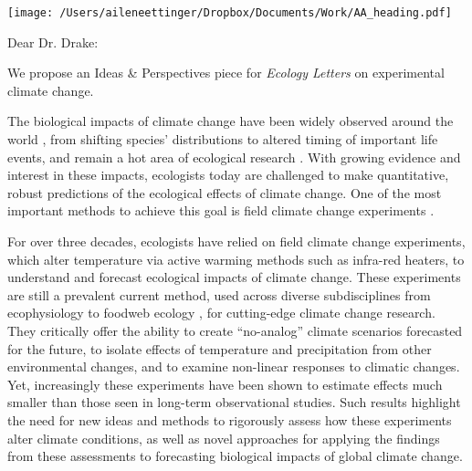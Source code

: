 \documentclass[11pt,a4paper]{letter}
\begin{document}


\begin{letter}{}
\texttt{[image: /Users/aileneettinger/Dropbox/Documents/Work/AA\_heading.pdf]}

\opening{Dear Dr. Drake:}
We propose an Ideas \& Perspectives piece for \emph{Ecology Letters} on experimental climate change. 

The biological impacts of climate change have been widely observed around the world \citep{ipcc2013}, from shifting species' distributions to altered timing of important life events, and remain a hot area of ecological research \citep{goring2017}. With growing evidence and interest in these impacts, ecologists today are challenged to make quantitative, robust predictions of the ecological effects of climate change. One of the most important methods to achieve this goal is field climate change experiments \citep{harte1995,cleland2006,Hoeppner2012} .

For over three decades, ecologists have relied on field climate change experiments, which alter temperature via active warming methods such as infra-red heaters, to understand and forecast ecological impacts of climate change. These experiments are still a prevalent current method, used across diverse subdisciplines from ecophysiology\citep{reich2015} to foodweb ecology \citep{barton2009}, for cutting-edge climate change research. They critically offer the ability to create ``no-analog'' climate scenarios forecasted for the future, to isolate effects of temperature and precipitation from other environmental changes, and to examine non-linear responses to climatic changes. Yet, increasingly these experiments have been shown to estimate effects much smaller than those seen in long-term observational studies\citep{wolkovich12}. Such results highlight the need for new ideas and methods to rigorously assess how these experiments alter climate conditions, as well as novel approaches for applying the findings from these assessments to forecasting biological impacts of global climate change. 


\end{letter}
\end{document}
